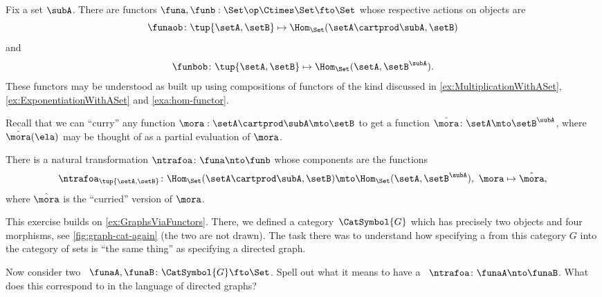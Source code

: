 \begin{example}
    Fix a set $\subA$.
    There are functors $\funa, \funb: \Set\op \Ctimes \Set \fto \Set$ whose respective actions on objects are
    \begin{equation}
        \funaob \colon \tup{\setA, \setB} \mapsto \Hom_\Set(\setA \cartprod \subA, \setB)
    \end{equation}
    and
    \begin{equation}
        \funbob \colon \tup{\setA, \setB} \mapsto \Hom_\Set(\setA, \setB^\subA).
    \end{equation}
    These functors may be understood as built up using compositions of functors of the kind discussed in \cref{ex:MultiplicationWithASet}, \cref{ex:ExponentiationWithASet} and \cref{exa:hom-functor}.

    Recall that we can ``curry'' any function $\mora : \setA \cartprod \subA \mto \setB$ to get a function $\hat \mora \colon \setA \mto \setB^\subA$, where $\hat \mora(\ela)$ may be thought of as a partial evaluation of $\mora$.

    There is a natural transformation $\ntrafoa \colon \funa \nto \funb$ whose components are the functions
    \begin{equation}\label{eq:currying-nat-trafo}
        \ntrafoa_{\tup{\setA, \setB}} \colon \Hom_\Set(\setA \cartprod \subA, \setB) \mto \Hom_\Set(\setA, \setB^\subA), \ \mora \mapsto \hat \mora,
    \end{equation}
    where $\hat \mora$ is the ``curried'' version of $\mora$.
\end{example}

\vfill

\begin{marginfigure}
    \centering
    \caption{}
    \label{fig:graph-cat-again}
\end{marginfigure}

\begin{gradedexercise}
    \label{ex:NatTrafosGraphs}
    This exercise builds on \cref{ex:GraphsViaFunctors}.
    There, we defined a category~$\CatSymbol{G}$ which has precisely two objects and four morphisms, see \cref{fig:graph-cat-again} (the two  are not drawn).
    The task there was to understand how specifying a  from this category $G$ into the category of sets is ``the same thing'' as specifying a directed graph.

    Now consider two ~$\funaA, \funaB \colon \CatSymbol{G} \fto \Set$.
    Spell out what it means to have a ~$\ntrafoa\colon \funaA \nto \funaB$.
    What does this correspond to in the language of directed graphs?
\end{gradedexercise}

